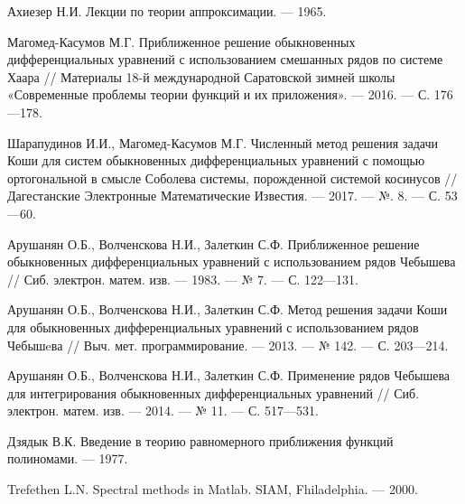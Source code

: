\begin{thebibliography}{99}
Ахиезер Н.И. Лекции по теории аппроксимации. --- 1965.





Магомед-Касумов М.Г. Приближенное решение обыкновенных дифференциальных уравнений с использованием смешанных рядов по системе Хаара // Материалы 18-й международной Саратовской зимней школы «Современные проблемы теории функций и их приложения». --- 2016. --- С. 176---178.





Шарапудинов И.И., Магомед-Касумов М.Г. Численный метод решения задачи Коши для систем обыкновенных дифференциальных уравнений с помощью ортогональной в смысле Соболева системы, порожденной системой косинусов // Дагестанские Электронные Математические Известия. --- 2017. --- №. 8. --- С. 53---60.





Арушанян О.Б., Волченскова Н.И., Залеткин С.Ф. Приближенное решение обыкновенных дифференциальных уравнений с использованием рядов Чебышева // Сиб. электрон. матем. изв. --- 1983. --- № 7. --- С. 122---131.





Арушанян О.Б., Волченскова Н.И., Залеткин С.Ф. Метод решения задачи Коши для обыкновенных дифференциальных уравнений с использованием рядов Чебышeва // Выч. мет. программирование. --- 2013. --- № 142. --- С. 203---214.





Арушанян О.Б., Волченскова Н.И., Залеткин С.Ф. Применение рядов Чебышева для интегрирования обыкновенных дифференциальных уравнений // Сиб. электрон. матем. изв. --- 2014. --- № 11. --- С. 517---531.





Дзядык В.К. Введение в теорию равномерного приближения функций полиномами. --- 1977.





Trefethen L.N. Spectral methods in Matlab. SIAM, Fhiladelphia. --- 2000.






\end{thebibliography}
